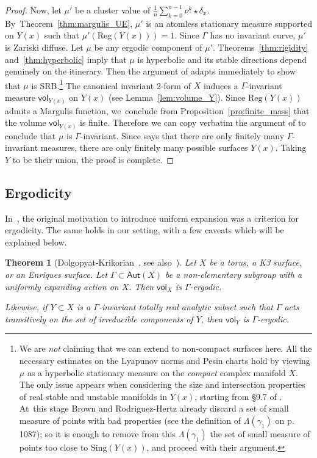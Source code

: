 \documentclass[JEP,XML,SOM,Unicode,published]{cedram}
\newcommand{\unsur}[1]{\frac{1}{#1}}
\newcommand{\Sing}{{\mathrm{Sing}}}
\newcommand\Aut{\mathsf{Aut}}
\newcommand{\vol}{{\mathsf{vol}}}
\theoremstyle{plain}
\newtheorem{thm}{Theorem}[section]
\theoremstyle{definition}
\begin{document}
\begin{proof}
Now, let $\mu'$ be a cluster value of
$\unsur{n}\sum_{k=0}^{n-1} \nu^k\star\delta_x$. By~Theorem~\ref{thm:margulis_UE}, $\mu'$
is an atomless stationary measure
supported on $Y(x)$ such that $\mu'(\mathrm{Reg}(Y(x)))=1$. Since $\Gamma$ has no invariant
curve, $\mu'$ is Zariski diffuse. Let $\mu$ be any ergodic component of $\mu'$.
Theorems~\ref{thm:rigidity} and~\ref{thm:hyperbolic} imply that $\mu$ is hyperbolic and its stable directions depend genuinely on the itinerary. Then the
argument of \cite[Th.\,3.1]{br} adapts immediately to show that $\mu$ is
SRB.\footnote{We are \emph{not} claiming that we can extend \cite{br} to non-compact surfaces here. All the necessary
estimates on the Lyapunov norms and Pesin charts
hold by viewing $\mu$ as a hyperbolic stationary measure on the
\emph{compact} complex manifold $X$. The only issue appears when considering the size and intersection
properties of real stable and unstable manifolds in $Y(x)$, starting from \S 9.7 of \cite{br}.
At~this stage Brown and Rodriguez-Hertz
already discard a set of small measure of points with bad properties (see the definition of $\Lambda(\gamma_1)$ on p. 1087); so it is enough to remove from this $\Lambda(\gamma_1)$ the set of
small measure of points too close to $\Sing(Y(x))$, and proceed with their argument.} The
canonical invariant 2-form of $X$ induces a $\Gamma$-invariant measure $\vol_{Y(x)}$
on $Y(x)$ (see Lemma~\ref{lem:volume_Y}). Since $\mathrm{Reg}(Y(x))$ admits a Margulis function, we~conclude from
Proposition~\ref{pro:finite_mass} that the volume $\vol_{Y(x)}$ is finite. Therefore we can copy verbatim the
argument of \cite[Th.\,3.4]{br} to conclude that $\mu$ is $\Gamma$-invariant.
Since \cite[Th.\,C]{invariant} says that there are only finitely many $\Gamma$-invariant measures,
there are only finitely many possible surfaces $Y(x)$. Taking $Y$ to be their union,
the proof is complete.
\end{proof}

\subsection{Ergodicity} \label{subs:ergodicity}
In~\cite{dolgopyat-krikorian}, the original motivation to introduce uniform
expansion was a criterion for ergodicity. The same holds in our setting, with a few caveats which will be explained below.

\begin{thm}[{Dolgopyat-Krikorian~\cite[Cor.\,2]{dolgopyat-krikorian}}, see also~\cite{liu_thesis, chung}]
\label{thm:dolgopyat-krikorian}
Let $X$ be a torus, a K3 surface, or an Enriques surface. Let $\Gamma\subset \Aut(X)$ be a
non-elementary subgroup with a uniformly expanding action on $X$. Then $\vol_X$ is $\Gamma$-ergodic.

Likewise, if $Y\subset X$ is a $\Gamma$-invariant totally real
analytic subset such that $\Gamma$ acts transitively on the
set of irreducible components of $Y$, then $\vol_Y$ is $\Gamma$-ergodic.
\end{thm}
\end{document}
